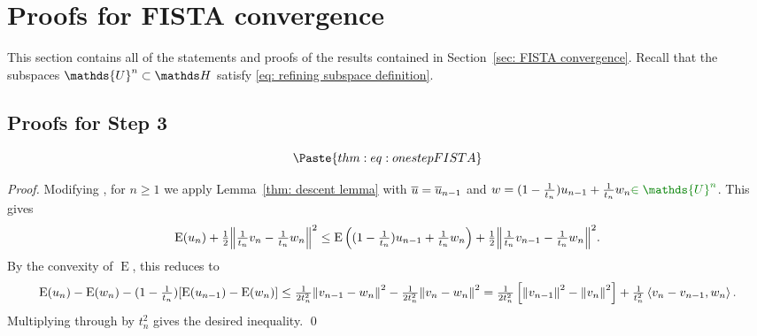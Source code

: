 \documentclass[smallextended]{svjour3}
\let\F\mathds\let\C\mathcal\newcommand{\R}{\F{R}}\newcommand{\A}{\tens{A}}
\newcommand{\norm}[1]{{\left\lVert #1 \right\rVert}}
\newcommand{\IP}[2]{\left\langle #1,#2 \right\rangle}
\newcommand{\op}[1]{\operatorname{#1}}
\newcommand{\1}{\F{1}}
\newcommand*{\varf}[1]{%
	\IfEqCase{#1}{%
		{0}{u}%
		{1}{v}%
		{2}{w}%
	}[u#1]%
}
\newcommand*{\spcf}[1]{%
	\IfEqCase{#1}{%
		{0}{\F{U}}%
		{1}{\F{V}}%
		{2}{\F{W}}%
	}[\F{U}#1]%
}
\newcommand{\edit}[2]{{\ifmmode\text{\color{red}\sout{\ensuremath{#1}}}\else {\color{red} \sout{#1}}\fi} {\color{darkgreen} #2}}
\begin{document}
	\section{Proofs for FISTA convergence}\label{app: FISTA convergence}
	This section contains all of the statements and proofs of the results contained in Section~\ref{sec: FISTA convergence}. \edit{}{Recall that the subspaces $\spcf0^n\subset\F H$ satisfy \eqref{eq: refining subspace definition}.}
	
	\subsection{Proofs for Step 3}
	
	\begin{theorem}\label{app:thm: one step FISTA}
		\begin{equation}
			\Paste{thm:eq: one step FISTA}
			\label{app:eq: one-step FISTA}
		\end{equation}
	\end{theorem}
	\begin{proof}
		Modifying \cite[\edit{Theorem 2}{Thm 3.2}]{Chambolle2015}, for $n\geq1$ we apply Lemma~\ref{thm: descent lemma} with $\bar{\varf0} = \bar{\varf0}_{n-1}$ and $\varf2 = (1-\frac{1}{t_{n}})\varf0_{n-1} + \frac{1}{t_{n}}\varf2_n\edit{}{\in\spcf0^n}$. This gives
		\begin{equation}
			\op{E}(\varf0_{n}) + \tfrac12\norm{\tfrac{1}{t_{n}}\varf1_{n}-\tfrac{1}{t_{n}}\varf2_n}^2 \leq \op{E}\left((1-\tfrac{1}{t_{n}})\varf0_{n-1}+\tfrac{1}{t_{n}}\varf2_n\right) + \tfrac12\norm{\tfrac{1}{t_{n}}\varf1_{n-1}-\tfrac{1}{t_{n}}\varf2_n}^2.
		\end{equation}
		By the convexity of $\op{E}$, this reduces to
		\begin{equation}
			\op{E}(\varf0_{n}) - \op{E}(\varf2_n) - (1-\tfrac{1}{t_{n}})[\op{E}(\varf0_{n-1})-\op{E}(\varf2_n)] \leq \tfrac1{2t_{n}^2}\norm{\varf1_{n-1}-\varf2_n}^2 - \tfrac1{2t_{n}^2}\norm{\varf1_{n}-\varf2_n}^2 = \tfrac1{2t_{n}^2}\left[\norm{\varf1_{n-1}}^2-\norm{\varf1_{n}}^2\right] + \tfrac1{t_{n}^2}\IP{\varf1_{n}-\varf1_{n-1}}{\varf2_n}.
		\end{equation}
		\edit{}{Multiplying through by $t_n^2$ gives the desired inequality.}
		\qed\end{proof}
	
	
	
\end{document}
